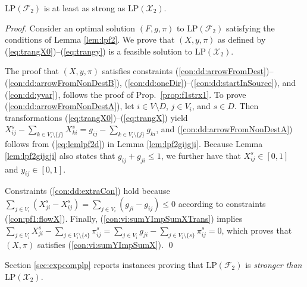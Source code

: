 \begin{prop}
\label{prop:f2strx2}
$\text{LP}(\mathcal{F}_2)$ is at least as strong as $\text{LP}(\mathcal{X}_2)$. 
\end{prop}
\begin{proof}
Consider an optimal solution $(F,g,\pi)$ to $\text{LP}(\mathcal{F}_2)$ satisfying the conditions of Lemma \ref{lem:lpf2}.
We prove that $(X,y,\pi)$ as defined by (\ref{eq:trangX0})--(\ref{eq:trangy}) is a feasible solution to $\text{LP}(\mathcal{X}_2)$.

The proof that $(X,y,\pi)$ satisfies constraints (\ref{con:dd:arrowFromDest})--(\ref{con:dd:arrowFromNonDestB}), (\ref{con:dd:oneDir})--(\ref{con:dd:startInSource}),
and (\ref{con:dd:yvar}),
follows the proof of Prop.\ \ref{prop:f1strx1}.
To prove (\ref{con:dd:arrowFromNonDestA}), let $i\in V\setminus D$, $j\in V_i$, and $s\in D$.
Then transformations (\ref{eq:trangX0})--(\ref{eq:trangX}) yield
$X_{ij}^s - \sum_{k\in V_{i}\setminus \{j\}}X_{ki}^s
= g_{ij} - \sum_{k\in V_{i}\setminus \{j\}}g_{ki}$, and (\ref{con:dd:arrowFromNonDestA}) follows from (\ref{eq:lemlpf2d}) in Lemma \ref{lem:lpf2gijgji}.
Because Lemma \ref{lem:lpf2gijgji} also states that $g_{ij}+g_{ji}\leq 1$, we further have that $X_{ij}^s\in[0,1]$ and $y_{ij}\in[0,1]$.

Constraints (\ref{con:dd:extraCon}) hold because
$\sum_{j\in V_i}\left(X_{ji}^s-X_{ij}^s\right)=\sum_{j\in V_i}\left(g_{ji}-g_{ij}\right)\leq 0$
according to constraints (\ref{con:pf1:flowX}).
Finally, (\ref{con:vi:sumYImpSumXTrans}) implies
$\sum_{j\in V_i}X_{ji}^s-\sum_{j\in V_i\setminus\{s\}}\pi_{ij}^s=\sum_{j\in V_i}g_{ji}-\sum_{j\in V_i\setminus\{s\}}\pi_{ij}^s=0$,
which proves that $(X,\pi)$ satisfies (\ref{con:vi:sumYImpSumX}).
\qed\end{proof}

\begin{remark}
\label{rem:f2strx2}
Section \ref{sec:expcomplp} reports instances proving that $\text{LP}(\mathcal{F}_2)$ is \emph{stronger than} $\text{LP}(\mathcal{X}_2)$. 
\end{remark}
